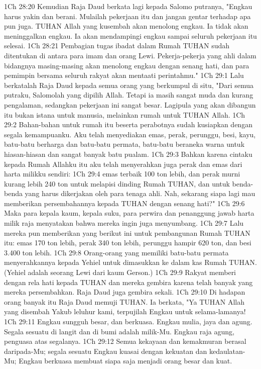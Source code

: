 1Ch 28:20  Kemudian Raja Daud berkata lagi kepada Salomo putranya, "Engkau harus yakin dan berani. Mulailah pekerjaan itu dan jangan gentar terhadap apa pun juga. TUHAN Allah yang kusembah akan menolong engkau. Ia tidak akan meninggalkan engkau. Ia akan mendampingi engkau sampai seluruh pekerjaan itu selesai.
1Ch 28:21  Pembagian tugas ibadat dalam Rumah TUHAN sudah ditentukan di antara para imam dan orang Lewi. Pekerja-pekerja yang ahli dalam bidangnya masing-masing akan menolong engkau dengan senang hati, dan para pemimpin bersama seluruh rakyat akan mentaati perintahmu."
1Ch 29:1  Lalu berkatalah Raja Daud kepada semua orang yang berkumpul di situ, "Dari semua putraku, Salomolah yang dipilih Allah. Tetapi ia masih sangat muda dan kurang pengalaman, sedangkan pekerjaan ini sangat besar. Lagipula yang akan dibangun itu bukan istana untuk manusia, melainkan rumah untuk TUHAN Allah.
1Ch 29:2  Bahan-bahan untuk rumah itu beserta perabotnya sudah kusiapkan dengan segala kemampuanku. Aku telah menyediakan emas, perak, perunggu, besi, kayu, batu-batu berharga dan batu-batu permata, batu-batu beraneka warna untuk hiasan-hiasan dan sangat banyak batu pualam.
1Ch 29:3  Bahkan karena cintaku kepada Rumah Allahku itu aku telah menyerahkan juga perak dan emas dari harta milikku sendiri:
1Ch 29:4  emas terbaik 100 ton lebih, dan perak murni kurang lebih 240 ton untuk melapisi dinding Rumah TUHAN, dan untuk benda-benda yang harus dikerjakan oleh para tenaga ahli. Nah, sekarang siapa lagi mau memberikan persembahannya kepada TUHAN dengan senang hati?"
1Ch 29:6  Maka para kepala kaum, kepala suku, para perwira dan penanggung jawab harta milik raja menyatakan bahwa mereka ingin juga menyumbang.
1Ch 29:7  Lalu mereka pun memberikan yang berikut ini untuk pembangunan Rumah TUHAN itu: emas 170 ton lebih, perak 340 ton lebih, perunggu hampir 620 ton, dan besi 3.400 ton lebih.
1Ch 29:8  Orang-orang yang memiliki batu-batu permata menyerahkannya kepada Yehiel untuk dimasukkan ke dalam kas Rumah TUHAN. (Yehiel adalah seorang Lewi dari kaum Gerson.)
1Ch 29:9  Rakyat memberi dengan rela hati kepada TUHAN dan mereka gembira karena telah banyak yang mereka persembahkan. Raja Daud juga gembira sekali.
1Ch 29:10  Di hadapan orang banyak itu Raja Daud memuji TUHAN. Ia berkata, "Ya TUHAN Allah yang disembah Yakub leluhur kami, terpujilah Engkau untuk selama-lamanya!
1Ch 29:11  Engkau sungguh besar, dan berkuasa. Engkau mulia, jaya dan agung. Segala sesuatu di langit dan di bumi adalah milik-Mu. Engkau raja agung, penguasa atas segalanya.
1Ch 29:12  Semua kekayaan dan kemakmuran berasal daripada-Mu; segala sesuatu Engkau kuasai dengan kekuatan dan kedaulatan-Mu; Engkau berkuasa membuat siapa saja menjadi orang besar dan kuat.
